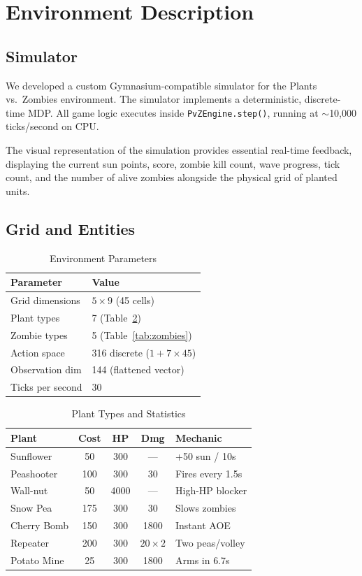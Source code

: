 \documentclass[conference]{IEEEtran}
\begin{document}
\section{Environment Description}

\subsection{Simulator}
We developed a custom Gymnasium-compatible simulator for the Plants vs.\ Zombies environment. The simulator implements a deterministic, discrete-time MDP. All game logic executes inside \texttt{PvZEngine.step()}, running at $\sim$10,000 ticks/second on CPU. 

The visual representation of the simulation provides essential real-time feedback, displaying the current sun points, score, zombie kill count, wave progress, tick count, and the number of alive zombies alongside the physical grid of planted units.

\subsection{Grid and Entities}

\begin{table}[htbp]
\centering
\caption{Environment Parameters}
\label{tab:env}
\begin{tabular}{@{}ll@{}}
\toprule
\textbf{Parameter} & \textbf{Value} \\
\midrule
Grid dimensions & $5 \times 9$ (45 cells) \\
Plant types & 7 (Table~\ref{tab:plants}) \\
Zombie types & 5 (Table~\ref{tab:zombies}) \\
Action space & 316 discrete ($1 + 7 \times 45$) \\
Observation dim & 144 (flattened vector) \\
Ticks per second & 30 \\
\bottomrule
\end{tabular}
\end{table}

\begin{table}[htbp]
\centering
\caption{Plant Types and Statistics}
\label{tab:plants}
\begin{tabular}{@{}lcccp{2.2cm}@{}}
\toprule
\textbf{Plant} & \textbf{Cost} & \textbf{HP} & \textbf{Dmg} & \textbf{Mechanic} \\
\midrule
Sunflower & 50 & 300 & --- & +50 sun / 10s \\
Peashooter & 100 & 300 & 30 & Fires every 1.5s \\
Wall-nut & 50 & 4000 & --- & High-HP blocker \\
Snow Pea & 175 & 300 & 30 & Slows zombies \\
Cherry Bomb & 150 & 300 & 1800 & Instant AOE \\
Repeater & 200 & 300 & $20{\times}2$ & Two peas/volley \\
Potato Mine & 25 & 300 & 1800 & Arms in 6.7s \\
\bottomrule
\end{tabular}
\end{table}
\end{document}
